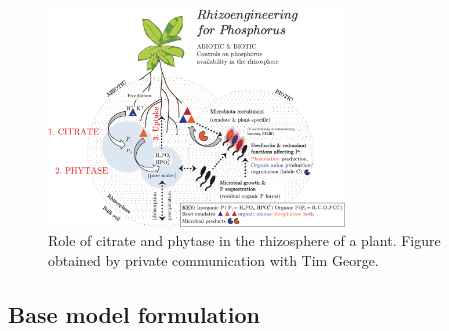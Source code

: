 \documentclass[11pt]{article}
\numberwithin{equation}{section}
\begin{document}
\begin{figure}[!htb]
     \centering
     \includegraphics[width=0.7\textwidth]{Figures/Rhizoengineering.pdf}
     \caption{Role of citrate and phytase in the rhizosphere of a plant. Figure obtained by private communication with Tim George. }
     \label{fig:CitPhys}
 \end{figure}

\subsection{Base model formulation}
\label{sec:bio_basemodel}
\end{document}

